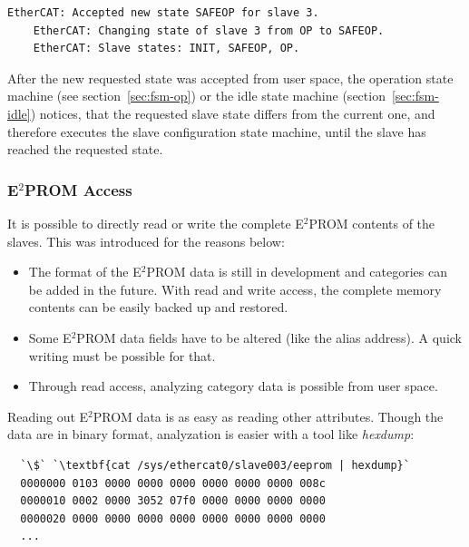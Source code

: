 \documentclass[a4paper,12pt,BCOR6mm,bibtotoc,idxtotoc]{scrbook}
\begin{document}
\begin{description}
  \begin{lstlisting}[gobble=4]
    EtherCAT: Accepted new state SAFEOP for slave 3.
    EtherCAT: Changing state of slave 3 from OP to SAFEOP.
    EtherCAT: Slave states: INIT, SAFEOP, OP.
  \end{lstlisting}

  After the new requested state was accepted from user space, the
  operation state machine (see section~\ref{sec:fsm-op}) or the idle
  state machine (section~\ref{sec:fsm-idle}) notices, that the
  requested slave state differs from the current one, and therefore
  executes the slave configuration state machine, until the slave has
  reached the requested state.
\end{description}


\subsubsection{E$^2$PROM Access}
\label{sec:eepromaccess}

It is possible to directly read or write the complete E$^2$PROM
contents of the slaves. This was introduced for the reasons below:

\begin{itemize}
\item The format of the E$^2$PROM data is still in development and
  categories can be added in the future. With read and write access,
  the complete memory contents can be easily backed up and restored.
\item Some E$^2$PROM data fields have to be altered (like the alias
  address). A quick writing must be possible for that.
\item Through read access, analyzing category data is possible from
  user space.
\end{itemize}

Reading out E$^2$PROM data is as easy as reading other
attributes. Though the data are in binary format, analyzation is
easier with a tool like \textit{hexdump}:

\begin{lstlisting}
  `\$` `\textbf{cat /sys/ethercat0/slave003/eeprom | hexdump}`
  0000000 0103 0000 0000 0000 0000 0000 0000 008c
  0000010 0002 0000 3052 07f0 0000 0000 0000 0000
  0000020 0000 0000 0000 0000 0000 0000 0000 0000
  ...
\end{lstlisting}
\end{document}
